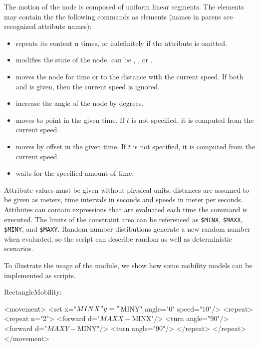 The motion of the node is composed of uniform linear segments.
The  elements may contain the the following commands as
elements (names in parens are recognized attribute names):

\begin{itemize}
\item {} repeats its content n times, or indefinitely if
       the  attribute is omitted.
\item {} modifies the state of the node.
       can be , , 
      or .
\item {} moves the node for  time or to the  distance
      with the current speed. If both  and  is given, then the current
      speed is ignored.
\item {} increase the angle of the node by  degrees.
\item {} moves to point  in the given time. If
      $t$ is not specified, it is computed from the current speed.
\item {} moves by offset  in the given time. If
      $t$ is not specified, it is computed from the current speed.
\item {} waits for the specified amount of time.
\end{itemize}

Attribute values must be given without physical units, distances are assumed
to be given as meters, time intervals in seconds and speeds in meter per seconds.
Attibutes can contain expressions that are evaluated each time the
command is executed. The limits of the constraint area can be
referenced as \verb!$MINX!, \verb!$MAXX!, \verb!$MINY!, and \verb!$MAXY!.
Random number distibutions generate a new random number when evaluated,
so the script can describe random as well as deterministic scenarios.

To illustrate the usage of the module, we show how some mobility
models can be implemented as scripts.

RectangleMobility:

\begin{XML}
<movement>
    <set x="$MINX" y="$MINY" angle="0" speed="10"/>
    <repeat>
        <repeat n="2">
            <forward d="$MAXX-$MINX"/>
            <turn angle="90"/>
            <forward d="$MAXY-$MINY"/>
            <turn angle="90"/>
        </repeat>
    </repeat>
</movement>
\end{XML}

